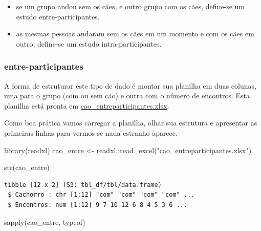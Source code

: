 \documentclass[
]{article}
\newenvironment{Shaded}{\begin{snugshade}}{\end{snugshade}}
\newcommand{\FunctionTok}[1]{\textcolor[rgb]{0.00,0.00,0.00}{#1}}
\newcommand{\NormalTok}[1]{#1}
\newcommand{\OtherTok}[1]{\textcolor[rgb]{0.56,0.35,0.01}{#1}}
\newcommand{\SpecialCharTok}[1]{\textcolor[rgb]{0.00,0.00,0.00}{#1}}
\newcommand{\StringTok}[1]{\textcolor[rgb]{0.31,0.60,0.02}{#1}}
\providecommand{\tightlist}{%
  \setlength{\itemsep}{0pt}\setlength{\parskip}{0pt}}
\begin{document}
\begin{itemize}
\tightlist
\item
  se um grupo andou sem os cães, e outro grupo com os cães, define-se um
  estudo entre-participantes.
\item
  as mesmas pessoas andaram sem os cães em um momento e com os cães em
  outro, define-se um estudo intra-participantes.
\end{itemize}

\hypertarget{entre-participantes}{%
\subsubsection{entre-participantes}\label{entre-participantes}}

A forma de estruturar este tipo de dado é montar sua planilha em duas
colunas, uma para o grupo (com ou sem cão) e outra com o número de
encontros. Esta planilha está pronta em
\url{cao_entreparticipantes.xlsx}.

Como boa prática vamos carregar a planilha, olhar sua estrutura e
apresentar as primeiras linhas para vermos se nada estranho aparece.

\begin{Shaded}
\begin{Highlighting}[]
\FunctionTok{library}\NormalTok{(readxl)}
\NormalTok{cao\_entre }\OtherTok{\textless{}{-}}\NormalTok{ readxl}\SpecialCharTok{::}\FunctionTok{read\_excel}\NormalTok{(}\StringTok{"cao\_entreparticipantes.xlsx"}\NormalTok{)}
\end{Highlighting}
\end{Shaded}

\begin{Shaded}
\begin{Highlighting}[]
\FunctionTok{str}\NormalTok{(cao\_entre)}
\end{Highlighting}
\end{Shaded}

\begin{verbatim}
tibble [12 x 2] (S3: tbl_df/tbl/data.frame)
 $ Cachorro : chr [1:12] "com" "com" "com" "com" ...
 $ Encontros: num [1:12] 9 7 10 12 6 8 4 5 3 6 ...
\end{verbatim}

\begin{Shaded}
\begin{Highlighting}[]
\FunctionTok{sapply}\NormalTok{(cao\_entre, typeof)}
\end{Highlighting}
\end{Shaded}
\end{document}

